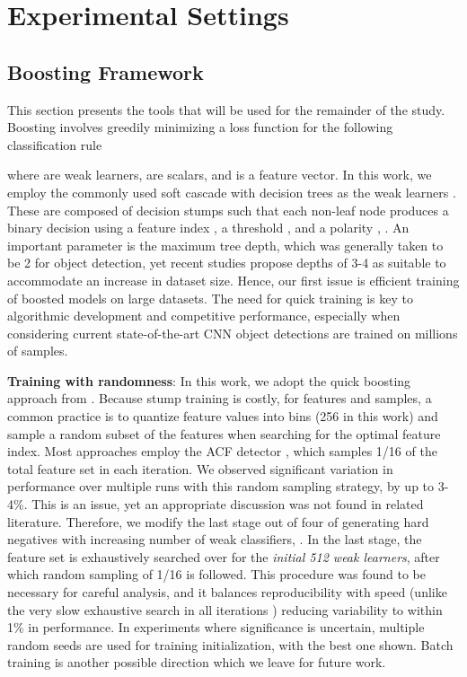 \documentclass[a4paper,conference]{IEEEtran_icpr}
\begin{document}
\section{Experimental Settings}

\subsection{Boosting Framework}
\label{subsec:boost}

This section presents the tools that will be used for the remainder of the study. Boosting \cite{boost} involves greedily minimizing a loss function for the following classification rule



where  are weak learners,  are scalars, and  is a feature vector. In this work, we employ the commonly used soft cascade with decision trees as the weak learners \cite{bourdev2005robust,bagging2}. These are composed of decision stumps such that each non-leaf node  produces a binary decision using a feature index , a threshold , and a polarity , . An important parameter is the maximum tree depth, which was generally taken to be 2 for object detection, yet recent studies \cite{ldcf,checkerboard,spatialpool} propose depths of 3-4 as suitable to accommodate an increase in dataset size. Hence, our first issue is efficient training of boosted models on large datasets. The need for quick training is key to algorithmic development and competitive performance, especially when considering current state-of-the-art CNN object detections are trained on millions of samples.



\textbf{Training with randomness}: In this work, we adopt the quick boosting approach from \cite{quickboost}. Because stump training is costly,  for  features and  samples, a common practice is to quantize feature values into bins (256 in this work) and sample a random subset of the features when searching for the optimal feature index. Most approaches employ the ACF detector \cite{DollarPAMI14pyramids}, which samples 1/16 of the total feature set in each iteration. We observed significant variation in performance over multiple runs with this random sampling strategy, by up to 3-4\%. This is an issue, yet an appropriate discussion was not found in related literature. Therefore, we modify the last stage out of four of generating hard negatives with increasing number of weak classifiers, . In the last stage, the feature set is exhaustively searched over for the \textit{initial 512 weak learners}, after which random sampling of 1/16 is followed. This procedure was found to be necessary for careful analysis, and it balances reproducibility with speed (unlike the very slow exhaustive search in all iterations \cite{checkerboard}) reducing variability to within 1\% in performance. In experiments where significance is uncertain, multiple random seeds are used for training initialization, with the best one shown. Batch training is another possible direction which we leave for future work.
\end{document}
